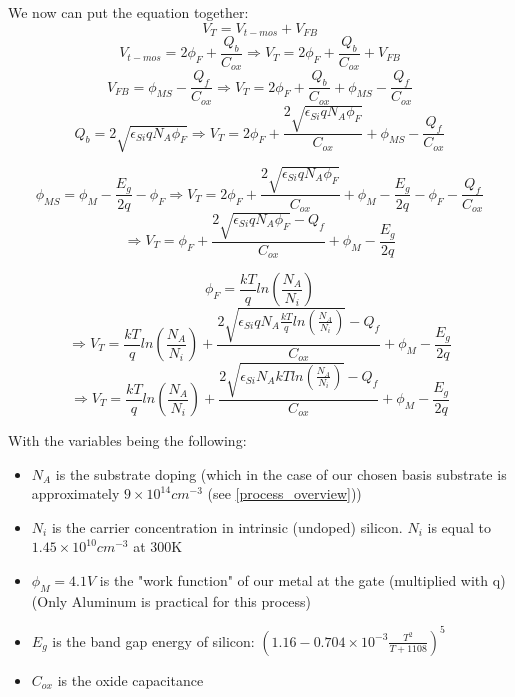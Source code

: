 We now can put the equation together:
\begin{equation}
V_T = V_{t-mos} + V_{FB}
\end{equation}
\begin{equation}
V_{t-mos}=2 \phi_F + \frac{Q_b}{C_{ox}}
\Rightarrow
V_T = 2 \phi_F + \frac{Q_b}{C_{ox}} + V_{FB}
\end{equation}
\begin{equation}
V_{FB}
=
\phi_{MS}-\frac{Q_f}{C_{ox}}
\Rightarrow
V_T = 2 \phi_F + \frac{Q_b}{C_{ox}} + \phi_{MS}-\frac{Q_f}{C_{ox}}
\end{equation}
\begin{equation}
Q_b
=
2 \sqrt{\epsilon_{Si} q N_A \phi_F }
\Rightarrow
V_T = 2 \phi_F + \frac{2 \sqrt{\epsilon_{Si} q N_A \phi_F }}{C_{ox}} + \phi_{MS}-\frac{Q_f}{C_{ox}}
\end{equation}


\begin{equation}
\phi_{MS}
=
\phi_{M} - \frac{E_g}{2 q}-\phi_F
\Rightarrow
V_T = 2 \phi_F + \frac{2 \sqrt{\epsilon_{Si} q N_A \phi_F }}{C_{ox}} + \phi_{M} - \frac{E_g}{2 q}-\phi_F -\frac{Q_f}{C_{ox}}
\end{equation}
\begin{equation}
\Rightarrow
V_T = \phi_F + \frac{2 \sqrt{\epsilon_{Si} q N_A \phi_F }-Q_f}{C_{ox}} + \phi_{M} - \frac{E_g}{2 q}
\end{equation}


\begin{equation}
\phi_F
=
\frac{k T}{q} ln\left(\frac{N_A}{N_i}\right)
\end{equation}
\begin{equation}
\Rightarrow
V_T = \frac{k T}{q} ln\left(\frac{N_A}{N_i}\right) + \frac{2 \sqrt{\epsilon_{Si} q N_A \frac{k T}{q} ln\left(\frac{N_A}{N_i}\right) }-Q_f}{C_{ox}} + \phi_{M} - \frac{E_g}{2 q}
\end{equation}
\begin{equation}
 \boxed{
\Rightarrow
V_T = \frac{k T}{q} ln\left(\frac{N_A}{N_i}\right) + \frac{2 \sqrt{\epsilon_{Si} N_A k T ln\left(\frac{N_A}{N_i}\right) }-Q_f}{C_{ox}} + \phi_{M} - \frac{E_g}{2 q}
}
\end{equation}


With the variables being the following:
\begin{itemize}
\item $N_A$ is the substrate doping (which in the case of our chosen basis substrate is approximately $9\times10^{14}cm^{-3}$ (see \autoref{process_overview}))
\item $N_i$ is the carrier concentration in intrinsic (undoped) silicon. $N_i$ is equal to $1.45 \times 10^{10} cm^{-3}$ at 300\degree K
\item $\phi_M = 4.1 V$ is the "work function" of our metal at the gate (multiplied with q) (Only Aluminum is practical for this process)
\item $E_g$ is the band gap energy of silicon: $\left(1.16-0.704 \times 10^{-3} \frac{T^2}{T+1108} \right)^5$
\item $C_{ox}$ is the oxide capacitance
\end{itemize}

